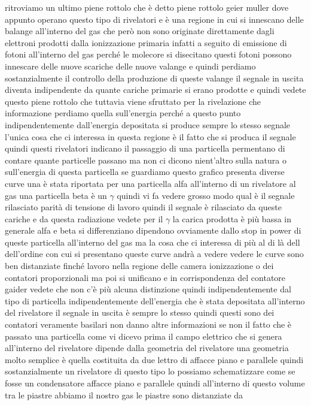 ritroviamo un ultimo piene rottolo che è detto piene rottolo geier muller dove appunto operano questo tipo di rivelatori e è una regione in cui si innescano delle balange all'interno del gas che però non sono originate direttamente dagli elettroni prodotti dalla ionizzazione primaria infatti a seguito di emissione di fotoni all'interno del gas perché le molecore si disecitano questi fotoni possono innescare delle nuove scariche delle nuove valange e quindi perdiamo sostanzialmente il controllo della produzione di queste valange il segnale in uscita diventa indipendente da quante cariche primarie si erano prodotte e quindi vedete questo piene rottolo che tuttavia viene sfruttato per la rivelazione che informazione perdiamo quella sull'energia perché a questo punto indipendentemente dall'energia depositata si produce sempre lo stesso segnale l'unica cosa che ci interessa in questa regione è il fatto che si produca il segnale quindi questi rivelatori indicano il passaggio di una particella permentano di contare quante particelle passano ma non ci dicono nient'altro sulla natura o sull'energia di questa particella se guardiamo questo grafico presenta diverse curve una è stata riportata per una particella alfa all'interno di un rivelatore al gas una particella beta è un $\gamma$ quindi vi fa vedere grosso modo qual è il segnale rilasciato parità di tensione di lavoro quindi il segnale è rilasciato da queste cariche e da questa radiazione vedete per il $\gamma$ la carica prodotta è più bassa in generale alfa e beta si differenziano dipendono ovviamente dallo stop in power di queste particella all'interno del gas ma la cosa che ci interessa di più al di là dell dell'ordine con cui si presentano queste curve andrà a vedere vedere le curve sono ben distanziate finché lavoro nella regione delle camera ionizzazione o dei contatori proporzionali ma poi si unificano e in corrispondenza del contatore gaider vedete che non c'è più alcuna distinzione quindi indipendentemente dal tipo di particella indipendentemente dell'energia che è stata depositata all'interno del rivelatore il segnale in uscita è sempre lo stesso quindi questi sono dei contatori veramente basilari non danno altre informazioni se non il fatto che è passato una particella come vi dicevo prima il campo elettrico che si genera all'interno del rivelatore dipende dalla geometria del rivelatore una geometria molto semplice è quella costituita da due lettro di affacce piano e parallele quindi sostanzialmente un rivelatore di questo tipo lo possiamo schematizzare come se fosse un condensatore affacce piano e parallele quindi all'interno di questo volume tra le piastre abbiamo il nostro gas le piastre sono distanziate da 

